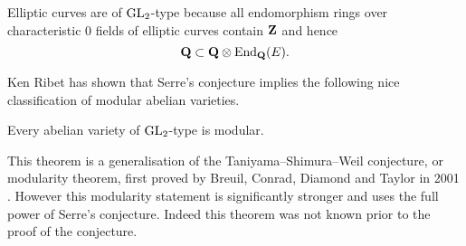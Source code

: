 \documentclass[a4paper,12pt]{article}
\begin{document}
\begin{ex}
Elliptic curves are of $\operatorname{GL}_2$-type because all endomorphism rings over characteristic 0 fields of elliptic curves contain $\mathbf{Z}$ and hence
\[
\mathbf{Q} \subset \mathbf{Q} \otimes \operatorname{End}_{\mathbf{Q}}(E).
\]
\end{ex}

Ken Ribet has shown \cite{Ribet04} that Serre's conjecture implies the following nice classification of modular abelian varieties.

\begin{thm}
Every abelian variety of $\operatorname{GL}_2$-type is modular.
\end{thm}

This theorem is a generalisation of the Taniyama--Shimura--Weil conjecture, or modularity theorem, first proved by Breuil, Conrad, Diamond and Taylor in 2001 \cite{BCDT}.
However this modularity statement is significantly stronger and uses the full power of Serre's conjecture.
Indeed this theorem was not known prior to the proof of the conjecture.




\end{document}

